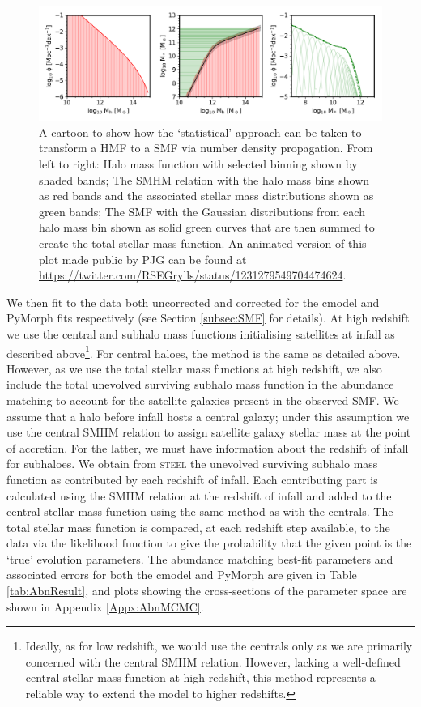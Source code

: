\begin{figure}[h]
    \centering
    \includegraphics[width = \linewidth]{Figures/Chapter2/gaussian_buildup.png}
    \caption{A cartoon to show how the `statistical' approach can be taken to transform a HMF to a SMF via number density propagation. From left to right: Halo mass function with selected binning shown by shaded bands; The SMHM relation with the halo mass bins shown as red bands and the associated stellar mass distributions shown as green bands; The SMF with the Gaussian distributions from each halo mass bin shown as solid green curves that are then summed to create the total stellar mass function. An animated version of this plot made public by PJG can be found at \url{https://twitter.com/RSEGrylls/status/1231279549704474624}.}
    \label{fig:Gauss_build}
\end{figure}

We then fit to the \citet{Davidzon2017TheSnapshots} data both uncorrected and corrected for the cmodel and PyMorph fits respectively (see Section \ref{subsec:SMF} for details). At high redshift we use the central and subhalo mass functions initialising satellites at infall as described above\footnote{Ideally, as for low redshift, we would use the centrals only as we are primarily concerned with the central SMHM relation. However, lacking a well-defined central stellar mass function at high redshift, this method represents a reliable way to extend the model to higher redshifts.}. For central haloes, the method is the same as detailed above. However, as we use the total stellar mass functions at high redshift, we also include the total unevolved surviving subhalo mass function in the abundance matching to account for the satellite galaxies present in the observed SMF. 
We assume that a halo before infall hosts a central galaxy; under this assumption we use the central SMHM relation to assign satellite galaxy stellar mass at the point of accretion. For the latter, we must have information about the redshift of infall for subhaloes. We obtain from \textsc{steel} the unevolved surviving subhalo mass function as contributed by each redshift of infall. Each contributing part is calculated using the SMHM relation at the redshift of infall and added to the central stellar mass function using the same method as with the centrals. The total stellar mass function is compared, at each redshift step available, to the data via the likelihood function to give the probability that the given point is the `true' evolution parameters. The abundance matching best-fit parameters and associated errors for both the cmodel and PyMorph are given in Table \ref{tab:AbnResult}, and plots showing the cross-sections of the parameter space are shown in Appendix \ref{Appx:AbnMCMC}.

